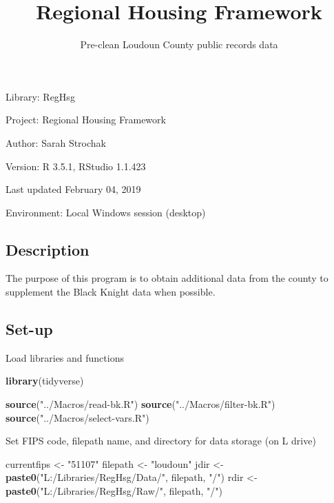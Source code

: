 \documentclass[]{article}
\title{Regional Housing Framework}
\subtitle{Pre-clean Loudoun County public records data}
\author{}
\date{}
\newenvironment{Shaded}{\begin{snugshade}}{\end{snugshade}}
\newcommand{\KeywordTok}[1]{\textcolor[rgb]{0.13,0.29,0.53}{\textbf{#1}}}
\newcommand{\StringTok}[1]{\textcolor[rgb]{0.31,0.60,0.02}{#1}}
\newcommand{\NormalTok}[1]{#1}
\begin{document}
\maketitle

{
\setcounter{tocdepth}{2}
\tableofcontents
}
Library: RegHsg

Project: Regional Housing Framework

Author: Sarah Strochak

Version: R 3.5.1, RStudio 1.1.423

Last updated February 04, 2019

Environment: Local Windows session (desktop)

\subsection{Description}\label{description}

The purpose of this program is to obtain additional data from the county
to supplement the Black Knight data when possible.

\subsection{Set-up}\label{set-up}

Load libraries and functions

\begin{Shaded}
\begin{Highlighting}[]
\KeywordTok{library}\NormalTok{(tidyverse)}

\KeywordTok{source}\NormalTok{(}\StringTok{"../Macros/read-bk.R"}\NormalTok{)}
\KeywordTok{source}\NormalTok{(}\StringTok{"../Macros/filter-bk.R"}\NormalTok{)}
\KeywordTok{source}\NormalTok{(}\StringTok{"../Macros/select-vars.R"}\NormalTok{)}
\end{Highlighting}
\end{Shaded}

Set FIPS code, filepath name, and directory for data storage (on L
drive)

\begin{Shaded}
\begin{Highlighting}[]
\NormalTok{currentfips <-}\StringTok{ "51107"}
\NormalTok{filepath <-}\StringTok{ "loudoun"}
\NormalTok{jdir <-}\StringTok{ }\KeywordTok{paste0}\NormalTok{(}\StringTok{"L:/Libraries/RegHsg/Data/"}\NormalTok{, filepath, }\StringTok{"/"}\NormalTok{)}
\NormalTok{rdir <-}\StringTok{ }\KeywordTok{paste0}\NormalTok{(}\StringTok{"L:/Libraries/RegHsg/Raw/"}\NormalTok{, filepath, }\StringTok{"/"}\NormalTok{)}
\end{Highlighting}
\end{Shaded}
\end{document}
